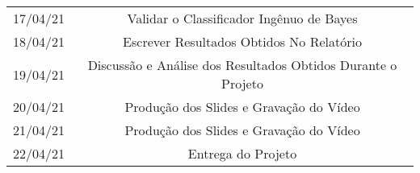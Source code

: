 \documentclass[conference]{IEEEtran}
\begin{document}
\begin{table}[!ht]
\begin{small}
\begin{tabular}{cc}
            17/04/21                & Validar o Classificador Ingênuo de Bayes\\
            18/04/21                & Escrever Resultados Obtidos No Relatório\\
            19/04/21                & Discussão e Análise dos Resultados Obtidos Durante o Projeto\\
            20/04/21                & Produção dos Slides e Gravação do Vídeo\\
            21/04/21                & Produção dos Slides e Gravação do Vídeo\\
            22/04/21                & Entrega do Projeto\\
            
            \hline
        \end{tabular}
    \end{small}
\end{table}






\nocite{*}

\end{document}
